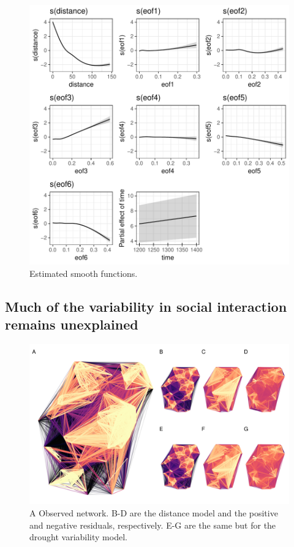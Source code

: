 \documentclass[fleqn,10pt]{wlscirep}
\begin{document}
\begin{figure}[!htbp]
\centering
\includegraphics[width=.6\linewidth]{figures/smooths.pdf}
\caption{Estimated smooth functions.}
\label{fig:smooths}
\end{figure}



\subsection*{Much of the variability in social interaction remains unexplained}

\begin{figure}[!htbp]
\centering
\includegraphics[width=.8\linewidth]{figures/null_model.png}
\caption{A Observed network. B-D are the distance model and the positive and negative residuals, respectively. E-G are the same but for the drought variability model.}
\label{fig:residuals}
\end{figure}
\end{document}
